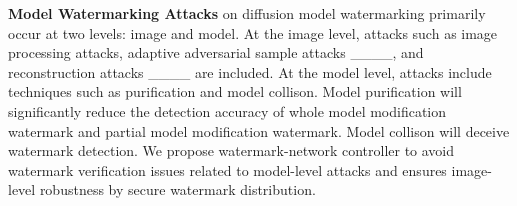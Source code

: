 




\noindent\textbf{Model Watermarking Attacks}
on diffusion model watermarking primarily occur at two levels: image and model. At the image level, attacks such as image processing attacks, adaptive adversarial sample attacks ____, and reconstruction attacks ____ are included. At the model level, attacks include techniques such as purification and model collison. 
Model purification will significantly reduce the detection accuracy of whole model modification watermark and partial model modification watermark. Model collison  will deceive watermark detection.
We propose watermark-network controller to avoid watermark verification issues related to model-level attacks and ensures image-level robustness by secure watermark distribution.